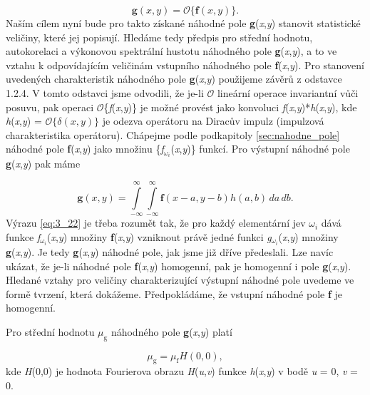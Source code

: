 \begin{equation} \label{eq:3_21}
    \mathbf{g}(x, y) = \mathscr{O}\{\mathbf{f}(x, y)\}.
\end{equation}
Naším cílem nyní bude pro takto získané náhodné pole \textbf{g}(\textit{x},\textit{y}) stanovit statistické veličiny, které jej popisují. Hledáme tedy předpis pro střední hodnotu, autokorelaci a výkonovou spektrální hustotu náhodného pole \textbf{g}(\textit{x},\textit{y}), a to ve vztahu k odpovídajícím veličinám vstupního náhodného pole \textbf{f}(\textit{x},\textit{y}). Pro stanovení uvedených charakteristik náhodného pole \textbf{g}(\textit{x},\textit{y}) použijeme závěrů z odstavce 1.2.4. V tomto odstavci jsme odvodili, že je-li $\mathscr{O}$ lineární operace invariantní vůči posuvu, pak operaci $\mathscr{O}$\{\textit{f}(\textit{x},\textit{y})\} je možné provést jako konvoluci \textit{f}(\textit{x},\textit{y})*\textit{h}(\textit{x},\textit{y}), kde \textit{h}(\textit{x},\textit{y}) = $\mathscr{O}\{\delta(x, y)\}$ je odezva operátoru na Diracův impulz (impulzová charakteristika operátoru). Chápejme podle podkapitoly \ref{sec:nahodne_pole} náhodné pole \textbf{f}(\textit{x},\textit{y}) jako množinu \{\textit{f}$_{\omega_i}$(\textit{x},\textit{y})\} funkcí. Pro výstupní náhodné pole \textbf{g}(\textit{x},\textit{y}) pak máme

\begin{equation} \label{eq:3_22}
    \mathbf{g}(x, y) = \int\limits_{-\infty}^{\infty} \int\limits_{-\infty}^{\infty} \mathbf{f}(x - a, y - b) h(a, b)\,da\,db.
\end{equation}
Výrazu \eqref{eq:3_22} je třeba rozumět tak, že pro každý elementární jev $\omega_i$ dává funkce \textit{f}$_{\omega_i}$(\textit{x},\textit{y}) množiny \textbf{f}(\textit{x},\textit{y}) vzniknout právě jedné funkci \textit{g}$_{\omega_i}$(\textit{x},\textit{y}) množiny \textbf{g}(\textit{x},\textit{y}). Je tedy \textbf{g}(\textit{x},\textit{y}) náhodné pole, jak jsme již dříve předeslali. Lze navíc ukázat, že je-li náhodné pole \textbf{f}(\textit{x},\textit{y}) homogenní, pak je homogenní i pole \textbf{g}(\textit{x},\textit{y}). Hledané vztahy pro veličiny charakterizující výstupní náhodné pole uvedeme ve formě tvrzení, která dokážeme. Předpokládáme, že vstupní náhodné pole \textbf{f} je homogenní.

\noindent Pro střední hodnotu $\mu_\mathrm{g}$ náhodného pole \textbf{g}(\textit{x},\textit{y}) platí 

\begin{equation} \label{eq:3_23}
    \mu_\mathrm{g} = \mu_\mathrm{f} H(0,0),
\end{equation}
kde \textit{H}(0,0) je hodnota Fourierova obrazu \textit{H}(\textit{u},\textit{v}) funkce \textit{h}(\textit{x},\textit{y}) v bodě \textit{u} = 0, \textit{v} = 0.

